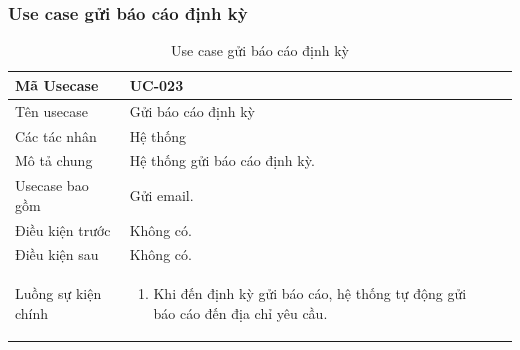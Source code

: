 \documentclass[12pt,a4paper]{article}
\begin{document}
    \subsubsection*{Use case gửi báo cáo định kỳ}
    \begin{table}[H]
        \centering
        \begin{tabular}{|p{3.5cm}|p{11.5cm}|c|}
            \hline
            Mã Usecase      & UC-023                        \\
            \hline
            Tên usecase     & Gửi báo cáo định kỳ           \\
            \hline
            Các tác nhân    & Hệ thống                      \\
            \hline
            Mô tả chung     & Hệ thống gửi báo cáo định kỳ. \\
            \hline
            Usecase bao gồm & Gửi email.                    \\
            \hline

            Điều kiện trước & Không có.                     \\
            \hline

            Điều kiện sau   & Không có.                     \\
            \hline

            Luồng sự kiện chính & \vspace{-.8cm}\begin{enumerate}
                                                    \item Khi đến định kỳ gửi báo cáo, hệ thống tự động gửi báo cáo đến địa chỉ yêu cầu.
            \end{enumerate}
            \\
            \hline
        \end{tabular}
        \caption{Use case gửi báo cáo định kỳ}

    \end{table}


\end{document}
